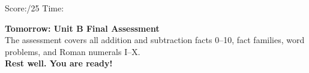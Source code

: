 \documentclass[12pt, letterpaper]{article}
\begin{document}
\bigskip
\noindent Score:\underline{\hspace{1.5cm}}/25 \hfill Time:\underline{\hspace{2cm}}

\bigskip
\begin{mdframed}[backgroundcolor=sd-gold!15,linecolor=sd-gold,linewidth=1.5pt,roundcorner=4pt,
  innerleftmargin=10pt,innerrightmargin=10pt,innertopmargin=8pt,innerbottommargin=8pt]
\textbf{\color{sd-gold}Tomorrow: Unit B Final Assessment}\\[4pt]
The assessment covers all addition and subtraction facts 0–10, fact families, word problems,
and Roman numerals I–X.\\[4pt]
\textbf{Rest well. You are ready!}
\end{mdframed}
\end{document}
